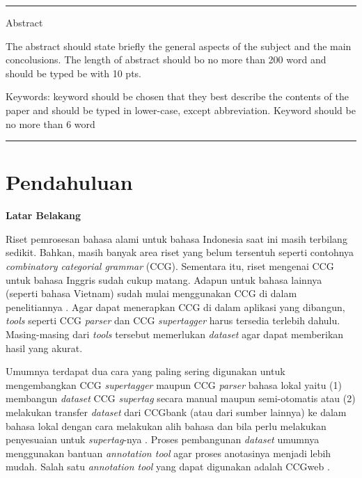 {%



\noindent\rule{\textwidth}{1pt}
Abstract

The abstract should state briefly the general aspects of the subject and the main concolusions.  The length of abstract should bo no more than 200 word and  should be typed be with 10 pts.

 \bigskip
Keywords: keyword should be chosen that they best describe the contents of the paper and should be typed in lower-case, except abbreviation. Keyword should be no more than 6 word 

\noindent\rule{\textwidth}{1pt} }
   



\section{Pendahuluan}

\noindent\textbf{Latar Belakang}

Riset pemrosesan bahasa alami untuk bahasa Indonesia saat ini masih terbilang sedikit.
Bahkan, masih banyak area riset yang belum tersentuh seperti contohnya
\textit{combinatory categorial grammar} (CCG).
Sementara itu, riset mengenai CCG untuk bahasa Inggris sudah cukup matang.
Adapun untuk bahasa lainnya (seperti bahasa Vietnam) sudah mulai menggunakan CCG di dalam
penelitiannya \citep{nguyen2019vietnamese}.
Agar dapat menerapkan CCG di dalam aplikasi yang dibangun, \textit{tools} seperti
CCG \textit{parser} dan CCG \textit{supertagger} harus tersedia terlebih dahulu.
Masing-masing dari \textit{tools} tersebut memerlukan \textit{dataset} agar dapat memberikan
hasil yang akurat.

Umumnya terdapat dua cara yang paling sering digunakan untuk mengembangkan CCG \textit{supertagger}
maupun CCG \textit{parser} bahasa lokal yaitu (1) membangun \textit{dataset} CCG \textit{supertag}
secara manual maupun semi-otomatis atau (2) melakukan transfer \textit{dataset} dari CCGbank
(atau dari sumber lainnya) ke dalam bahasa lokal dengan cara melakukan alih bahasa dan bila perlu
melakukan penyesuaian untuk \textit{supertag}-nya \citep{hockenmaier-steedman-2007-ccgbank}.
Proses pembangunan \textit{dataset} umumnya menggunakan bantuan \textit{annotation tool} agar
proses anotasinya menjadi lebih mudah.
Salah satu \textit{annotation tool} yang dapat digunakan adalah
CCGweb \citep{evang-etal-2019-ccgweb}.

